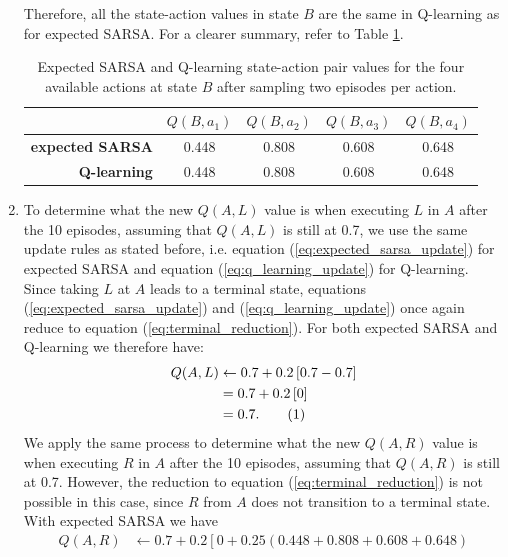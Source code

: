 \documentclass{article}
\newcommand\numberthis{\addtocounter{equation}{1}\tag{\theequation}}
\begin{document}
\begin{enumerate}
	      Therefore, all the state-action values in state $B$ are the same in Q-learning as for
	      expected SARSA. For a clearer summary, refer to Table \ref{tab:b_qvalues}.
	      \begin{table}[ht]
		      \centering
		      \caption{Expected SARSA and Q-learning state-action pair values for the four available
			      actions at state $B$ after sampling two episodes per action.}
		      \label{tab:b_qvalues}
		      \begin{tabular}{@{}rcccc@{}}
			      \toprule
			                              & $Q(B, a_1)$ & $Q(B, a_2)$ & $Q(B, a_3)$ & $Q(B, a_4)$ \\ \midrule
			      \textbf{expected SARSA} & 0.448       & 0.808       & 0.608       & 0.648       \\
			      \textbf{Q-learning}     & 0.448       & 0.808       & 0.608       & 0.648       \\ \bottomrule
		      \end{tabular}
	      \end{table}
	\item \label{q:5.4.2}To determine what the new $Q(A, L)$ value is when executing $L$ in $A$ after the 10
	      episodes, assuming that $Q(A, L)$ is still at 0.7, we use the same update rules as stated
	      before, i.e. equation (\ref{eq:expected_sarsa_update}) for expected SARSA and equation
	      (\ref{eq:q_learning_update}) for Q-learning. Since taking $L$ at $A$ leads to a terminal
	      state, equations (\ref{eq:expected_sarsa_update}) and (\ref{eq:q_learning_update}) once
	      again reduce to equation (\ref{eq:terminal_reduction}). For both expected SARSA and
	      Q-learning we therefore have:
	      \begin{align*}
		      Q(A, L) & \leftarrow 0.7 + 0.2 \left[ 0.7 - 0.7 \right] \\
		              & = 0.7 + 0.2 \left[ 0 \right]                  \\
		              & = 0.7. \numberthis
	      \end{align*}
	      We apply the same process to determine what the new $Q(A, R)$ value is when executing $R$ in
	      $A$ after the 10 episodes, assuming that $Q(A, R)$ is still at 0.7. However, the reduction
	      to equation (\ref{eq:terminal_reduction}) is not possible in this case, since $R$ from $A$
	      does not transition to a terminal state. With expected SARSA we have
	      \begin{align*}
		      Q(A, R) & \leftarrow 0.7 + 0.2 \left[ 0 + 0.25\left(0.448 + 0.808 + 0.608 + 0.648\right)

\end{align*}
\end{enumerate}
\end{document}
